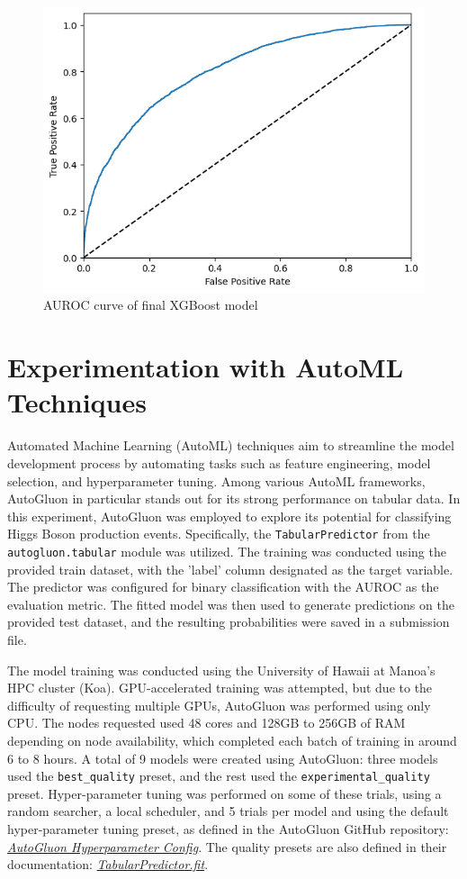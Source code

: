 \documentclass[letterpaper]{article}
\begin{document}
	\begin{figure}[H]
		\centering
		\includegraphics[width=0.7\linewidth]{XGBoostAUROC}
		\caption{AUROC curve of final XGBoost model}
		\label{fig:xgboostauroc}
	\end{figure}
	
	\section{Experimentation with AutoML Techniques}
	
	Automated Machine Learning (AutoML) techniques aim to streamline the model development process by automating tasks such as feature engineering, model selection, and hyperparameter tuning. Among various AutoML frameworks, AutoGluon in particular stands out for its strong performance on tabular data. In this experiment, AutoGluon was employed to explore its potential for classifying Higgs Boson production events. Specifically, the \texttt{TabularPredictor} from the \texttt{autogluon.tabular} module was utilized. The training was conducted using the provided train dataset, with the 'label' column designated as the target variable. The predictor was configured for binary classification with the AUROC as the evaluation metric. The fitted model was then used to generate predictions on the provided test dataset, and the resulting probabilities were saved in a submission file.
	
	The model training was conducted using the University of Hawaii at Manoa's HPC cluster (Koa). GPU-accelerated training was attempted, but due to the difficulty of requesting multiple GPUs, AutoGluon was performed using only CPU. The nodes requested used 48 cores and 128GB to 256GB of RAM depending on node availability, which completed each batch of training in around 6 to 8 hours. A total of 9 models were created using AutoGluon: three models used the \texttt{best\_quality} preset, and the rest used the \texttt{experimental\_quality} preset. Hyper-parameter tuning was performed on some of these trials, using a random searcher, a local scheduler, and 5 trials per model and using the default hyper-parameter tuning preset, as defined in the AutoGluon GitHub repository: \href{https://github.com/autogluon/autogluon/blob/e9fb676160be13467d321df24fddc60f152c2813/tabular/src/autogluon/tabular/configs/hyperparameter_configs.py#L8-L38}{\textit{AutoGluon Hyperparameter Config}}. The quality presets are also defined in their documentation: \href{https://auto.gluon.ai/stable/api/autogluon.tabular.TabularPredictor.fit.html}{\textit{TabularPredictor.fit}}.
	
\end{document}
